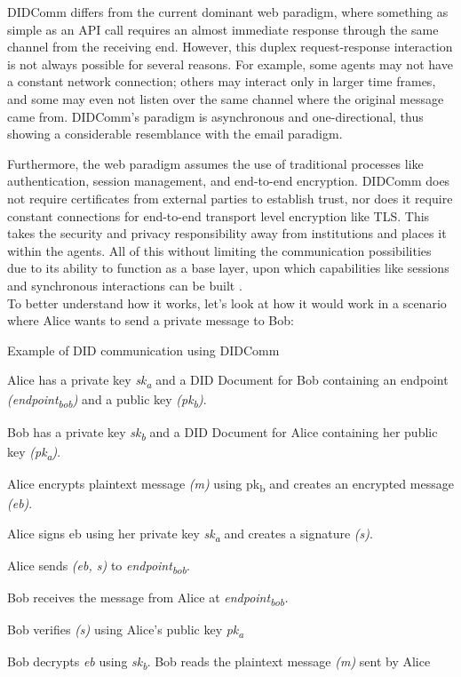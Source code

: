 DIDComm differs from the current dominant web paradigm, where something as simple as an API call requires an almost immediate response through the same channel from the receiving end. However, this duplex request-response interaction is not always possible for several reasons. For example, some agents may not have a constant network connection; others may interact only in larger time frames, and some may even not listen over the same channel where the original message came from. DIDComm's paradigm is asynchronous and one-directional, thus showing a considerable resemblance with the email paradigm. \

Furthermore, the web paradigm assumes the use of traditional processes like authentication, session management, and end-to-end encryption. DIDComm does not require certificates from external parties to establish trust, nor does it require constant connections for end-to-end transport level encryption like TLS. This takes the security and privacy responsibility away from institutions and places it within the agents. All of this without limiting the communication possibilities due to its ability to function as a base layer, upon which capabilities like sessions and synchronous interactions can be built \cite{curren_looker_terbu_2020}.\\ 
To better understand how it works, let's look at how it would work in a scenario where Alice wants to send a private message to Bob: 

\begin{algorithm}[H]
\caption{Example of DID communication using DIDComm \cite{Abramson_2020}}
\label{alg:didcomm_example}
  \begin{algorithmic}[1]
    \State Alice has a private key \emph{sk\textsubscript{a}} and a DID Document for Bob containing an endpoint \emph{(endpoint\textsubscript{bob})} and a public key \emph{(pk\textsubscript{b})}.

    \State Bob has a private key \emph{sk\textsubscript{b}} and a DID Document for Alice containing her public key \emph{(pk\textsubscript{a})}.

    \State Alice encrypts plaintext message \emph{(m)} using pk\textsubscript{b} and creates an encrypted message \emph{(eb)}.

    \State Alice signs eb using her private key \emph{sk\textsubscript{a}} and creates a signature \emph{(s)}.

    \State Alice sends \emph{(eb, s)} to \emph{endpoint\textsubscript{bob}}.

    \State Bob receives the message from Alice at \emph{{endpoint\textsubscript{bob}}.}

    \State Bob verifies \emph{(s)} using Alice's public key \emph{pk\textsubscript{a}}

    \State Bob decrypts \emph{eb} using \emph{sk\textsubscript{b}}.
    \State Bob reads the plaintext message \emph{(m)} sent by Alice
    \EndIf
  \end{algorithmic}
\end{algorithm}

